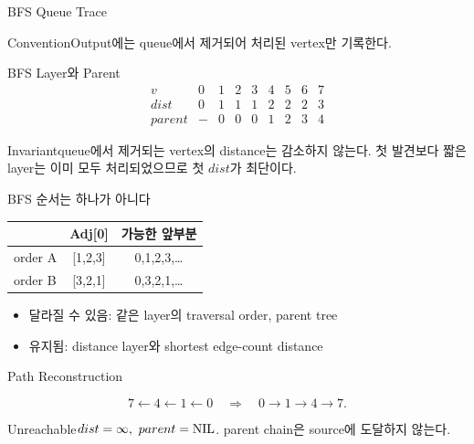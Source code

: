 \begin{frame}{BFS Queue Trace}
\centering
{}
\begin{block}{Convention}Output에는 queue에서 제거되어 처리된 vertex만 기록한다.\end{block}
\end{frame}
\begin{frame}{BFS Layer와 Parent}
\[
\begin{array}{c|cccccccc}v&0&1&2&3&4&5&6&7\\\hline
dist&0&1&1&1&2&2&2&3\\parent&-&0&0&0&1&2&3&4
\end{array}
\]
\begin{block}{Invariant}queue에서 제거되는 vertex의 distance는 감소하지 않는다. 첫 발견보다 짧은 layer는 이미 모두 처리되었으므로 첫 \(dist\)가 최단이다.\end{block}
\end{frame}
\begin{frame}{BFS 순서는 하나가 아니다}
\small\centering\begin{tabular}{lcc}\toprule&Adj[0]&가능한 앞부분\\\midrule
order A&[1,2,3]&0,1,2,3,\ldots\\
order B&[3,2,1]&0,3,2,1,\ldots\\\bottomrule\end{tabular}
\begin{itemize}\item 달라질 수 있음: 같은 layer의 traversal order, parent tree\item 유지됨: distance layer와 shortest edge-count distance\end{itemize}
\end{frame}
\begin{frame}{Path Reconstruction}
\[
7\leftarrow4\leftarrow1\leftarrow0\quad\Longrightarrow\quad0\to1\to4\to7.
\]
\begin{block}{Unreachable}\(dist=\infty,\ parent=\NIL\). parent chain은 source에 도달하지 않는다.\end{block}
\end{frame}
